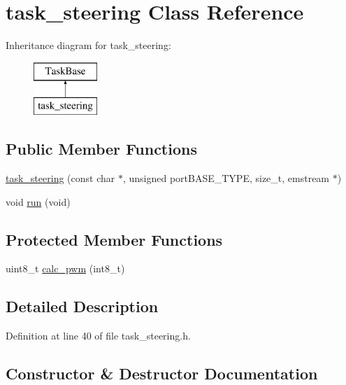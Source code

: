 \hypertarget{classtask__steering}{}\section{task\+\_\+steering Class Reference}
\label{classtask__steering}
Inheritance diagram for task\+\_\+steering\+:\begin{figure}[H]
\begin{center}
\leavevmode
\includegraphics[height=2.000000cm]{classtask__steering}
\end{center}
\end{figure}
\subsection*{Public Member Functions}
\begin{DoxyCompactItemize}
\item 
\mbox{\hyperlink{classtask__steering_af8a9a96908212f23d97b2f859b571c4d}{task\+\_\+steering}} (const char $\ast$, unsigned port\+B\+A\+S\+E\+\_\+\+T\+Y\+PE, size\+\_\+t, emstream $\ast$)
\item 
void \mbox{\hyperlink{classtask__steering_a223e9f1d50c0c48ff5326b7ae01ae689}{run}} (void)
\end{DoxyCompactItemize}
\subsection*{Protected Member Functions}
\begin{DoxyCompactItemize}
\item 
uint8\+\_\+t \mbox{\hyperlink{classtask__steering_a6f33131ca25de22a81282b1142d939b3}{calc\+\_\+pwm}} (int8\+\_\+t)
\end{DoxyCompactItemize}


\subsection{Detailed Description}


Definition at line 40 of file task\+\_\+steering.\+h.



\subsection{Constructor \& Destructor Documentation}
\mbox{\label{classtask__steering_af8a9a96908212f23d97b2f859b571c4d}} 
